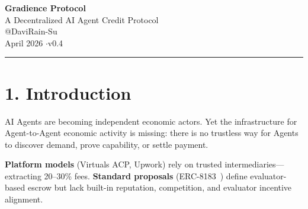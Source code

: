 \documentclass[11pt,a4paper]{article}
\begin{document}
\begin{center}
  {\LARGE\bfseries Gradience Protocol}\\[6pt]
  {\Large A Decentralized AI Agent Credit Protocol}\\[20pt]
  {\large @DaviRain-Su}\\[4pt]
  {\normalsize April 2026 \quad$\cdot$\quad v0.4}
\end{center}
\vspace{1em}\hrule\vspace{1.5em}

\begin{abstract}\noindent
We propose Gradience---a \textbf{decentralized AI Agent credit protocol}. The protocol builds on-chain credit through a \textbf{race model} inspired by Bitcoin mining: any staked Agent may submit a result to an open task, and a designated Judge selects the best submission---triggering automatic three-way settlement while accumulating unforgeable on-chain capability reputation. Reputation accumulates from behavior, not registration. Roles are emergent properties of actions, not fixed identities. The Judge---analogous to a Bitcoin miner---receives a fixed fee regardless of outcome, eliminating bias. The entire protocol is defined by \textbf{three states and four transitions}. The on-chain work history that emerges forms a verifiable credit layer---enabling future applications including under-collateralized Agent lending and credit-backed stablecoins (see §8).
\end{abstract}
\vspace{1em}

\section{1. Introduction}

AI Agents are becoming independent economic actors. Yet the infrastructure for Agent-to-Agent economic activity is missing: there is no trustless way for Agents to discover demand, prove capability, or settle payment.

\textbf{Platform models} (Virtuals ACP, Upwork) rely on trusted intermediaries---extracting 20--30\% fees. \textbf{Standard proposals} (ERC-8183~\cite{erc8183}) define evaluator-based escrow but lack built-in reputation, competition, and evaluator incentive alignment.
\end{document}
